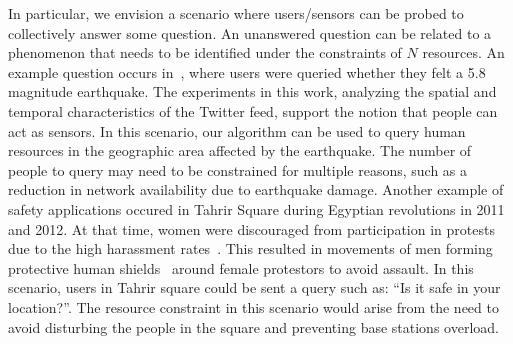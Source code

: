 \documentclass{acm_proc_article-sp}
\begin{document}
In particular, we envision a scenario where users/sensors can be probed to collectively answer some question. An unanswered question can be related to a phenomenon that needs to be identified under the constraints of $N$ resources. An example question occurs in~\cite{crooks2013earthquake}, where users were queried whether they felt a 5.8 magnitude earthquake. The experiments in this work, analyzing the spatial and temporal characteristics of the Twitter feed, support the notion that people can act as sensors. In this scenario, our algorithm can be used to query human resources in the geographic area affected by the earthquake. The number of people to query may need to be constrained for multiple reasons, such as a reduction in network availability due to earthquake damage. Another example of safety applications occured in Tahrir Square during Egyptian revolutions in 2011 and 2012. At that time, women were discouraged from participation in protests due to the high harassment rates~\cite{guardianSH}. This resulted in movements of men forming protective human shields~\cite{worldPostHS} around female protestors to avoid assault. In this scenario, users in Tahrir square could be sent a query such as: ``Is it safe in your location?''. The resource constraint in this scenario would arise from the need to avoid disturbing the people in the square and preventing base stations overload. \par
\end{document}
